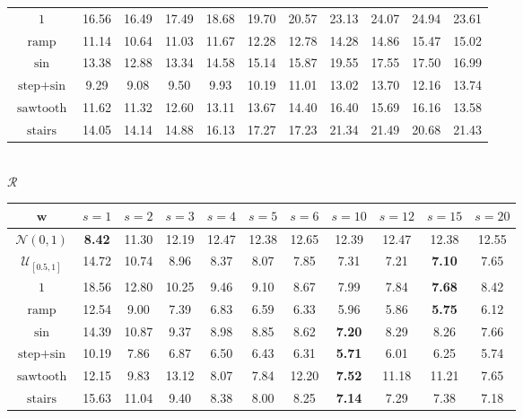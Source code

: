 \documentclass[conference]{IEEEtran}
\begin{document}
\begin{table}[hbt]
\begin{tabular}{c|cccccccccc}
        \rowcolor{lightgray} $1$                       & 16.56 & 16.49 & 17.49 & 18.68 & 19.70 & 20.57 & 23.13 & 24.07 & 24.94 & 23.61\\
        $\operatorname{ramp}$     & 11.14 & 10.64 & 11.03 & 11.67 & 12.28 & 12.78 & 14.28 & 14.86 & 15.47 & 15.02\\
        \rowcolor{lightgray} $\operatorname{sin}$      & 13.38 & 12.88 & 13.34 & 14.58 & 15.14 & 15.87 & 19.55 & 17.55 & 17.50 & 16.99\\
        $\operatorname{step+sin}$ &  9.29 &  9.08 &  9.50 &  9.93 & 10.19 & 11.01 & 13.02 & 13.70 & 12.16 & 13.74\\
        \rowcolor{lightgray} $\operatorname{sawtooth}$ & 11.62 & 11.32 & 12.60 & 13.11 & 13.67 & 14.40 & 16.40 & 15.69 & 16.16 & 13.58\\
        $\operatorname{stairs}$   & 14.05 & 14.14 & 14.88 & 16.13 & 17.27 & 17.23 & 21.34 & 21.49 & 20.68 & 21.43\\
        \hline
    \end{tabular}
    \vspace{3mm}\\
    $\mathcal{R}$\vspace{1mm}\\
    \begin{tabular}{c|cccccccccc}
        \hline
        $\mathbf{w}$ & $s = 1$ & $s = 2$ & $s = 3$ & $s = 4$ & $s = 5$ & $s = 6$ & $s = 10$ & $s = 12$ & $s = 15$ & $s = 20$\\
        \hline
        \rowcolor{lightgray} $\mathcal{N}(0,1)$        & {\color{mygreen} \textbf{8.42}} & 11.30 & 12.19 & 12.47 & 12.38 & 12.65 & 12.39 & 12.47 & 12.38 & 12.55\\
        $\mathcal{U}_{[0.5, 1]}$  & 14.72 & 10.74 & 8.96 & 8.37 & 8.07 & 7.85 & 7.31 & 7.21 & {\color{mygreen} \textbf{7.10}} & 7.65\\
        \rowcolor{lightgray} $1$                       & 18.56 & 12.80 & 10.25 &  9.46 &  9.10 &  8.67 &  7.99 &  7.84 &  {\color{mygreen} \textbf{7.68}} &  8.42\\
        $\operatorname{ramp}$     & 12.54 &  9.00 &  7.39 &  6.83 &  6.59 &  6.33 &  5.96 &  5.86 &  {\color{mygreen} \textbf{5.75}} &  6.12\\
        \rowcolor{lightgray} $\operatorname{sin}$      & 14.39 & 10.87 &  9.37 &  8.98 &  8.85 &  8.62 &  {\color{mygreen} \textbf{7.20}} &  8.29 &  8.26 &  7.66\\
        $\operatorname{step+sin}$ & 10.19 &  7.86 &  6.87 &  6.50 &  6.43 &  6.31 &  {\color{mygreen} \textbf{5.71}} &  6.01 &  6.25 &  5.74\\
        \rowcolor{lightgray} $\operatorname{sawtooth}$ & 12.15 & 9.83 & 13.12 &  8.07 &  7.84 & 12.20 &  {\color{mygreen} \textbf{7.52}} & 11.18 & 11.21 &  7.65\\
        $\operatorname{stairs}$   & 15.63 & 11.04 &  9.40 &  8.38 &  8.00 &  8.25 &  {\color{mygreen} \textbf{7.14}} &  7.29 &  7.38 &  7.18\\
        \hline
    \end{tabular}
\end{table}
\end{document}
